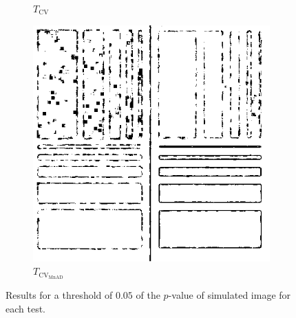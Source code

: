 \documentclass[aspectratio=1610,10pt]{beamer}
\begin{document}
\begin{frame}
\begin{figure}[H]
\begin{subfigure}[b]{0.3\textwidth}
    \caption{$T_\text{CV}$}
    \label{fig:sim_SAR_Images_p05-2}
  \end{subfigure}
  \hfill
  \begin{subfigure}[b]{0.3\textwidth}
    \centering
    \includegraphics[width=\textwidth]{../../Figures/PNG/mnad_005_Phantom_7_z1}
     \caption{$T_{\text{CV}_{\text{MnAD}}}$}
    \label{fig:sim_SAR_Images_p05-3}
  \end{subfigure}
  \caption{Results for a threshold of $0.05$ of the $p$-value of simulated image for each test. }
  \label{fig:sim_SAR_Images_p05}
\end{figure}
 
\end{frame} 
\end{document}
